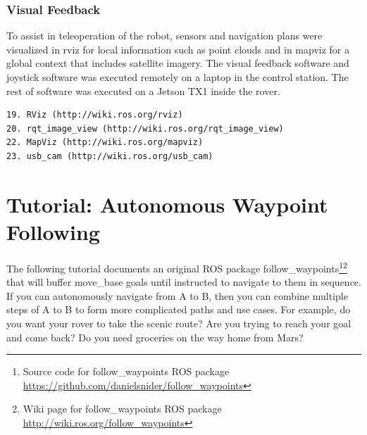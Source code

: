 \documentclass[runningheads,a4paper]{llncs}
\begin{document}
\subsubsection*{Visual Feedback}
To assist in teleoperation of the robot, sensors and navigation plans were visualized in rviz for local information such as point clouds and in mapviz for a global context that includes satellite imagery. The visual feedback software and joystick software was executed remotely on a laptop in the control station. The rest of software was executed on a Jetson TX1 inside the rover.

\begin{lstlisting}[frame=single,caption={Visual feedback software used by Team R3 (numbers refer to Fig. \ref{fig:Diagram}).},basicstyle=\sffamily\scriptsize]
19. RViz (http://wiki.ros.org/rviz)
20. rqt_image_view (http://wiki.ros.org/rqt_image_view)
22. MapViz (http://wiki.ros.org/mapviz)
23. usb_cam (http://wiki.ros.org/usb_cam)
\end{lstlisting}

\section{Tutorial: Autonomous Waypoint Following}\label{waypoint}

The following tutorial documents an original ROS package follow\_waypoints\footnote{Source code for follow\_waypoints ROS package \url{https://github.com/danielsnider/follow_waypoints}}\footnote{Wiki page for follow\_waypoints ROS package \url{http://wiki.ros.org/follow_waypoints}} that will buffer move\_base goals until instructed to navigate to them in sequence. If you can autonomously navigate from A to B, then you can combine multiple steps of A to B to form more complicated paths and use cases. For example, do you want your rover to take the scenic route? Are you trying to reach your goal and come back? Do you need groceries on the way home from Mars?

\end{document}
